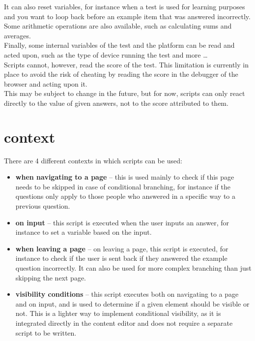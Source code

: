 \documentclass[12pt]{article} %
\begin{document}
    It can also reset variables, for instance when a test is used for learning purposes and you want to loop back before an example item that was answered incorrectly.\\

    Some arithmetic operations are also available, such as calculating sums and averages.\\

    Finally, some internal variables of the test and the platform can be read and acted upon, such as the type of device running the test and more \ldots\\

    Scripts cannot, however, read the score of the test. This limitation is currently in place to avoid the risk of cheating by reading the score in the debugger of the browser and acting upon it.\\
    This may be subject to change in the future, but for now, scripts can only react directly to the value of given answers, not to the score attributed to them.\\


    \section{context}\label{sec:context}

    There are 4 different contexts in which scripts can be used:\\
    \begin{itemize}
        \item \textbf{when navigating to a page} – this is used mainly to check if this page needs to be skipped in case of conditional branching, for instance if the questions only apply to those people who answered in a specific way to a previous question.
        \item \textbf{on input} – this script is executed when the user inputs an answer, for instance to set a variable based on the input.
        \item \textbf{when leaving a page} – on leaving a page, this script is executed, for instance to check if the user is sent back if they answered the example question incorrectly. It can also be used for more complex branching than just skipping the next page.
        \item \textbf{visibility conditions} – this script executes both on navigating to a page and on input, and is used to determine if a given element should be visible or not. This is a lighter way to implement conditional visibility, as it is integrated directly in the content editor and does not require a separate script to be written.
    \end{itemize}
\end{document}
